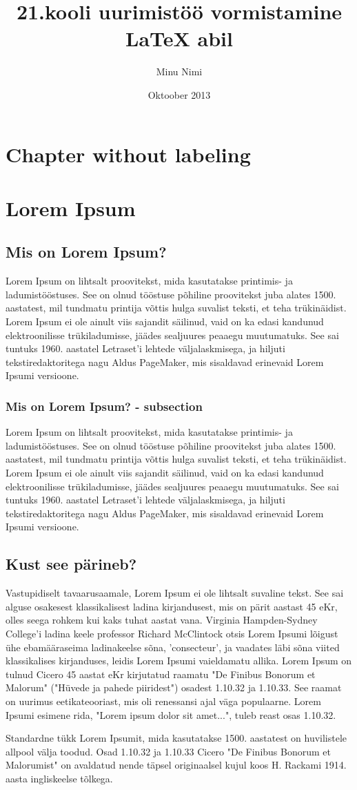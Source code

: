 \documentclass{21kuur}
\begin{document}
\title{21.kooli uurimistöö vormistamine LaTeX abil}
\author{Minu Nimi}
\date{Oktoober 2013}
\maketitle

\chapter*{Chapter without labeling}


\chapter{Lorem Ipsum}

\section{Mis on Lorem Ipsum?}
Lorem Ipsum on lihtsalt proovitekst, mida kasutatakse printimis- ja ladumistööstuses. See on olnud tööstuse põhiline proovitekst juba alates 1500. aastatest, mil tundmatu printija võttis hulga suvalist teksti, et teha trükinäidist. Lorem Ipsum ei ole ainult viis sajandit säilinud, vaid on ka edasi kandunud elektroonilisse trükiladumisse, jäädes sealjuures peaaegu muutumatuks. See sai tuntuks 1960. aastatel Letraset'i lehtede väljalaskmisega, ja hiljuti tekstiredaktoritega nagu Aldus PageMaker, mis sisaldavad erinevaid Lorem Ipsumi versioone.

\subsection{Mis on Lorem Ipsum? - subsection}
Lorem Ipsum on lihtsalt proovitekst, mida kasutatakse printimis- ja ladumistööstuses. See on olnud tööstuse põhiline proovitekst juba alates 1500. aastatest, mil tundmatu printija võttis hulga suvalist teksti, et teha trükinäidist. Lorem Ipsum ei ole ainult viis sajandit säilinud, vaid on ka edasi kandunud elektroonilisse trükiladumisse, jäädes sealjuures peaaegu muutumatuks. See sai tuntuks 1960. aastatel Letraset'i lehtede väljalaskmisega, ja hiljuti tekstiredaktoritega nagu Aldus PageMaker, mis sisaldavad erinevaid Lorem Ipsumi versioone.

\section{Kust see pärineb?}
Vastupidiselt tavaarusaamale, Lorem Ipsum ei ole lihtsalt suvaline tekst. See sai alguse osakesest klassikalisest ladina kirjandusest, mis on pärit aastast 45 eKr, olles seega rohkem kui kaks tuhat aastat vana. Virginia Hampden-Sydney College'i ladina keele professor Richard McClintock otsis Lorem Ipsumi lõigust ühe ebamääraseima ladinakeelse sõna, 'consecteur', ja vaadates läbi sõna viited klassikalises kirjanduses, leidis Lorem Ipsumi vaieldamatu allika. Lorem Ipsum on tulnud Cicero 45 aastat eKr kirjutatud raamatu "De Finibus Bonorum et Malorum" ("Hüvede ja pahede piiridest") osadest 1.10.32 ja 1.10.33. See raamat on uurimus eetikateooriast, mis oli renessansi ajal väga populaarne. Lorem Ipsumi esimene rida, "Lorem ipsum dolor sit amet...", tuleb reast osas 1.10.32.

Standardne tükk Lorem Ipsumit, mida kasutatakse 1500. aastatest on huvilistele allpool välja toodud. Osad 1.10.32 ja 1.10.33 Cicero "De Finibus Bonorum et Malorumist" on avaldatud nende täpsel originaalsel kujul koos H. Rackami 1914. aasta ingliskeelse tõlkega.
\end{document}
